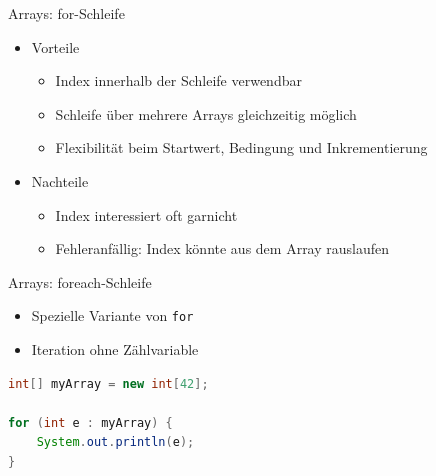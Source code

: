 \documentclass[18pt]{beamer}
\begin{document}
\begin{frame}{Arrays: for-Schleife}
    \begin{itemize}
        \item Vorteile
        \begin{itemize}
            \item Index innerhalb der Schleife verwendbar
            \item Schleife über mehrere Arrays gleichzeitig möglich
            \item Flexibilität beim Startwert, Bedingung und Inkrementierung
        \end{itemize}
        \vspace{.2in}
        \item Nachteile
        \begin{itemize}
            \item Index interessiert oft garnicht
            \item Fehleranfällig: Index könnte aus dem Array rauslaufen
        \end{itemize}
    \end{itemize}
\end{frame}

\begin{frame}[fragile]{Arrays: foreach-Schleife}
    \begin{itemize}
        \item Spezielle Variante von \texttt{for}
        \item Iteration ohne Zählvariable
    \end{itemize}

    \begin{exampleblock}{}
        \begin{lstlisting}[language=Java]
int[] myArray = new int[42];

for (int e : myArray) {
    System.out.println(e);
}
        \end{lstlisting}
    \end{exampleblock}
\end{frame}
\end{document}

